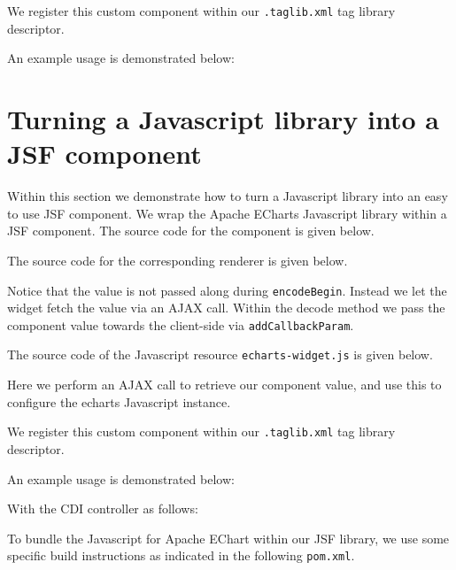 We register this custom component within our \texttt{.taglib.xml} tag library descriptor.


An example usage is demonstrated below:


\section{Turning a Javascript library into a JSF component}
Within this section we demonstrate how to turn a Javascript library into an easy to use JSF component.
We wrap the Apache ECharts \cite{ECharts} Javascript library within a JSF component.
The source code for the component is given below.


The source code for the corresponding renderer is given below.

Notice that the value is not passed along during \texttt{encodeBegin}.
Instead we let the widget fetch the value via an AJAX call.
Within the decode method we pass the component value towards the client-side via \texttt{addCallbackParam}.

The source code of the Javascript resource \texttt{echarts-widget.js} is given below.

Here we perform an AJAX call to retrieve our component value, and use this to configure the echarts Javascript instance.

We register this custom component within our \texttt{.taglib.xml} tag library descriptor.


An example usage is demonstrated below:


With the CDI controller as follows:


To bundle the Javascript for Apache EChart within our JSF library, we use some specific build instructions as indicated in the following \texttt{pom.xml}.
